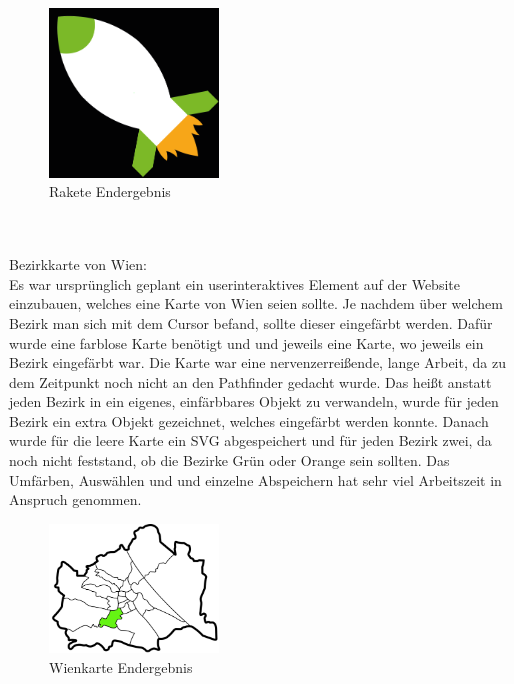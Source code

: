 \begin{figure}[H] 
  \centering
     \includegraphics[width=0.4\textwidth]{design_abb9.png}
  \caption{Rakete Endergebnis}
\end{figure}

\leavevmode \\
\leavevmode \\
Bezirkkarte von Wien:
\leavevmode \\
Es war ursprünglich geplant ein userinteraktives Element auf der Website einzubauen, welches eine Karte von Wien seien sollte. Je nachdem über welchem Bezirk man sich mit dem Cursor befand, sollte dieser eingefärbt werden. Dafür wurde eine farblose Karte benötigt und und jeweils eine Karte, wo jeweils ein Bezirk eingefärbt war. Die Karte war eine nervenzerreißende, lange Arbeit, da zu dem Zeitpunkt noch nicht an den Pathfinder gedacht wurde. Das heißt anstatt jeden Bezirk in ein eigenes, einfärbbares Objekt zu verwandeln, wurde für jeden Bezirk ein extra Objekt gezeichnet, welches eingefärbt werden konnte. Danach wurde für die leere Karte ein SVG abgespeichert und für jeden Bezirk zwei, da noch nicht feststand, ob die Bezirke Grün oder Orange sein sollten. Das Umfärben, Auswählen und und einzelne Abspeichern hat sehr viel Arbeitszeit in Anspruch genommen.

\begin{figure}[H] 
  \centering
     \includegraphics[width=0.4\textwidth]{design_abb10.png}
  \caption{Wienkarte Endergebnis}
\end{figure}